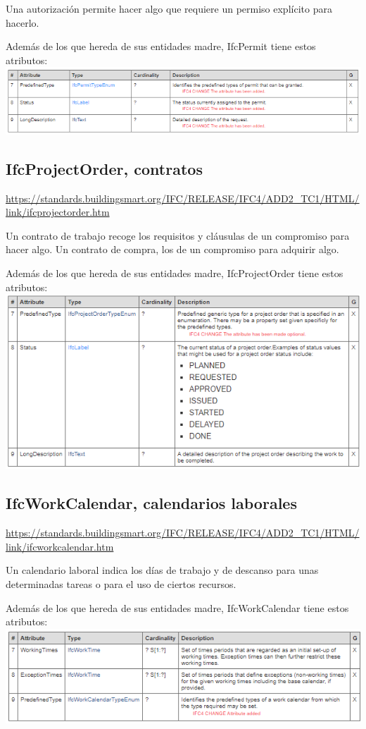\documentclass[spanish,12pt,a4paper,final,oneside]{book}
\begin{document}
Una autorización permite hacer algo que requiere un permiso explícito para hacerlo.

Además de los que hereda de sus entidades madre, IfcPermit tiene estos atributos:
\\ \includegraphics[width=\textwidth]{atributos de IfcPermit}


\subsection{IfcProjectOrder, contratos}
\url{https://standards.buildingsmart.org/IFC/RELEASE/IFC4/ADD2_TC1/HTML/link/ifcprojectorder.htm}

Un contrato de trabajo recoge los requisitos y cláusulas de un compromiso para hacer algo. Un contrato de compra, los de un compromiso para adquirir algo.

Además de los que hereda de sus entidades madre, IfcProjectOrder tiene estos atributos:
\\ \includegraphics[width=\textwidth]{atributos de IfcProjectOrder}


\subsection{IfcWorkCalendar, calendarios laborales}
\url{https://standards.buildingsmart.org/IFC/RELEASE/IFC4/ADD2_TC1/HTML/link/ifcworkcalendar.htm}

Un calendario laboral indica los días de trabajo y de descanso para unas determinadas tareas o para el uso de ciertos recursos.

Además de los que hereda de sus entidades madre, IfcWorkCalendar tiene estos atributos:
\\ \includegraphics[width=\textwidth]{atributos de IfcWorkCalendar}
\end{document}
